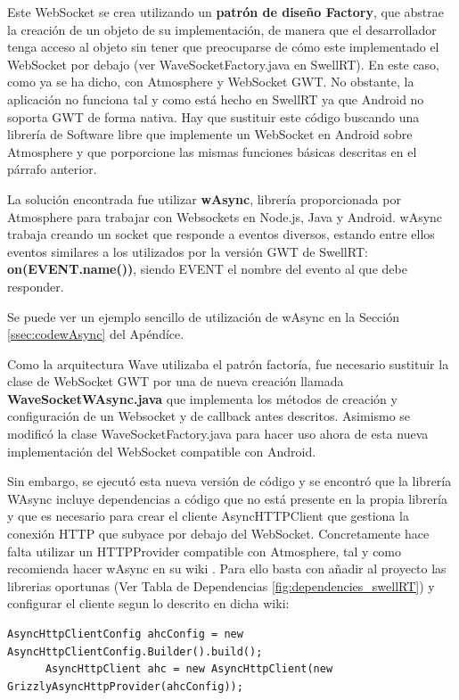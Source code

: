 	Este WebSocket se crea utilizando un \textbf{patrón de diseño Factory}, que abstrae la creación de un objeto de su implementación, de manera que el desarrollador tenga acceso al objeto sin tener que preocuparse de cómo este implementado el WebSocket por debajo (ver WaveSocketFactory.java en SwellRT). En este caso, como ya se ha dicho, con Atmosphere y WebSocket GWT. No obstante, la aplicación no funciona tal y como está hecho en SwellRT ya que Android no soporta GWT de forma nativa. Hay que sustituir este código buscando una librería de Software libre que implemente un WebSocket en Android sobre Atmosphere y que porporcione las mismas funciones básicas descritas en el párrafo anterior.
	
	La solución encontrada fue utilizar \textbf{wAsync}\cite{ref:wAsync_github}, librería proporcionada por Atmosphere para trabajar con Websockets en Node.js, Java y Android. wAsync trabaja creando un socket que responde a eventos diversos, estando entre ellos eventos similares a los utilizados por la versión GWT de SwellRT: \textbf{on(EVENT.name())}, siendo EVENT el nombre del evento al que debe responder. 
	
	Se puede ver un ejemplo sencillo de utilización de wAsync en la Sección \ref{ssec:codewAsync} del Apéndíce.
	
	Como la arquitectura Wave utilizaba el patrón factoría, fue necesario sustituir la clase de WebSocket GWT por una de nueva creación llamada \textbf{WaveSocketWAsync.java}\cite{ref:wave_migration_github} que implementa los métodos de creación y configuración de un Websocket y de callback antes descritos. Asimismo se modificó la clase WaveSocketFactory.java para hacer uso ahora de esta nueva implementación del WebSocket compatible con Android. 
	
	Sin embargo, se ejecutó esta nueva versión de código y se encontró que la librería WAsync incluye dependencias a código que no está presente en la propia librería y que es necesario para crear el cliente AsyncHTTPClient que gestiona la conexión HTTP que subyace por debajo del WebSocket. Concretamente hace falta utilizar un HTTPProvider compatible con Atmosphere, tal y como recomienda hacer wAsync en su wiki \cite{ref:httpProvider_wAsync}. Para ello basta con añadir al proyecto las librerias oportunas (Ver Tabla de Dependencias \ref{fig:dependencies_swellRT}) y configurar el cliente segun lo descrito en dicha wiki:
		
	  \begin{lstlisting}[frame=single]	
	  AsyncHttpClientConfig ahcConfig = new AsyncHttpClientConfig.Builder().build();
	  AsyncHttpClient ahc = new AsyncHttpClient(new GrizzlyAsyncHttpProvider(ahcConfig));
	  \end{lstlisting}
      
